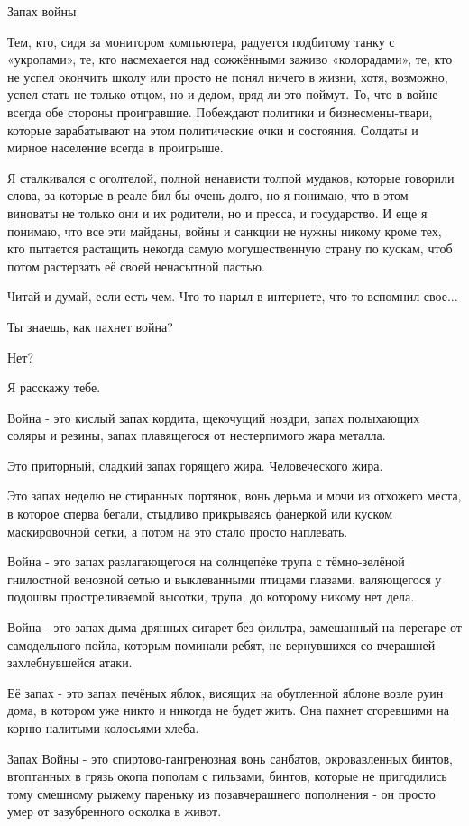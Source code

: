 Запах войны

Тем, кто, сидя за монитором компьютера, радуется подбитому танку с «укропами»,
те, кто насмехается над сожжёнными заживо «колорадами», те, кто не успел
окончить школу или просто не понял ничего в жизни, хотя, возможно, успел стать
не только отцом, но и дедом, вряд ли это поймут. То, что в войне всегда обе
стороны проигравшие. Побеждают политики и бизнесмены-твари, которые
зарабатывают на этом политические очки и состояния. Солдаты и мирное население
всегда в проигрыше.

Я сталкивался с оголтелой, полной ненависти толпой мудаков, которые говорили
слова, за которые в реале бил бы очень долго, но я понимаю, что в этом виноваты
не только они и их родители, но и пресса, и государство. И еще я понимаю, что
все эти майданы, войны и санкции не нужны никому кроме тех, кто пытается
растащить некогда самую могущественную страну по кускам, чтоб потом растерзать
её своей ненасытной пастью.

Читай и думай, если есть чем. Что-то нарыл в интернете, что-то вспомнил свое...

Ты знаешь, как пахнет война?

Нет?

Я расскажу тебе.

Война - это кислый запах кордита, щекочущий ноздри, запах полыхающих соляры и
резины, запах плавящегося от нестерпимого жара металла.

Это приторный, сладкий запах горящего жира. Человеческого жира.

Это запах неделю не стиранных портянок, вонь дерьма и мочи из отхожего места, в
которое сперва бегали, стыдливо прикрываясь фанеркой или куском маскировочной
сетки, а потом на это стало просто наплевать.

Война - это запах разлагающегося на солнцепёке трупа с тёмно-зелёной гнилостной
венозной сетью и выклеванными птицами глазами, валяющегося у подошвы
простреливаемой высотки, трупа, до которому никому нет дела.

Война - это запах дыма дрянных сигарет без фильтра, замешанный на перегаре от
самодельного пойла, которым поминали ребят, не вернувшихся со вчерашней
захлебнувшейся атаки.

Её запах - это запах печёных яблок, висящих на обугленной яблоне возле руин
дома, в котором уже никто и никогда не будет жить. Она пахнет сгоревшими на
корню налитыми колосьями хлеба.

Запах Войны - это спиртово-гангренозная вонь санбатов, окровавленных бинтов,
втоптанных в грязь окопа пополам с гильзами, бинтов, которые не пригодились
тому смешному рыжему пареньку из позавчерашнего пополнения - он просто умер от
зазубренного осколка в живот.

